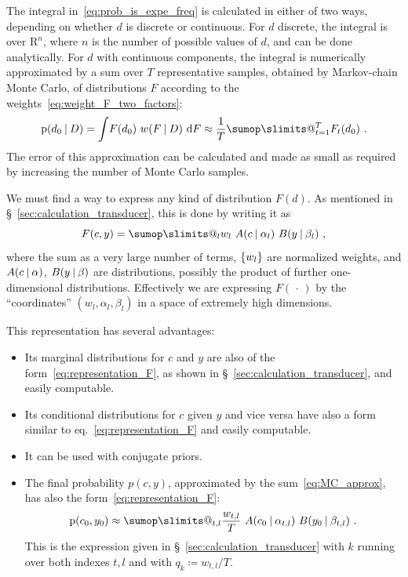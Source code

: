 \documentclass[\ifafour a4paper,12pt,\else a5paper,10pt,\fi%
onecolumn,oneside,article,%
british%
]{memoir}
\makeatletter
\theoremstyle{remark}
\theoremstyle{innote}
\def\sum{\DOTSI\sumop\slimits@}
\newcommand*{\di}{\mathrm{d}}%
\newcommand*{\RR}{\bm{\mathrm{R}}}
\newcommand*{\defd}{\coloneqq}
\newcommand*{\dotv}{\mathord{\,\cdot\,}}%
\DeclarePairedDelimiter\set{\{}{\}} %
\newcommand*{\p}{\mathrm{p}}%
\renewcommand*{\|}[1][]{\nonscript\:#1\vert\nonscript\:\mathopen{}}
\newcommand*{\sect}{\S}%
\newcommand*{\eqn}{eq.}%
\newcommand*{\wf}{w}
\makeatother
\begin{document}
The integral in~\eqref{eq:prob_is_expe_freq} is calculated in either of two ways, depending on whether $d$ is discrete or continuous. For $d$ discrete, the integral is over $\RR^{n}$, where $n$ is the number of possible values of $d$, and can be done analytically. For $d$ with continuous components, the integral is numerically approximated by a sum over $T$ representative samples, obtained by Markov-chain Monte Carlo, of distributions $F$ according to the weights~\eqref{eq:weight_F_two_factors}:
\begin{equation}
  \label{eq:MC_approx}
  \p(d_{0} \| D) = \int\! F(d_{0})\ \wf(F \| D)\ \di F
  \approx
\frac{1}{T}\sum_{t=1}^{T} F_{t}(d_{0}) \ .  
\end{equation}
The error of this approximation can be calculated and made as small as required by increasing the number of Monte Carlo samples.

We must find a way to express any kind of distribution $F(d)$. As mentioned in \sect~\ref{sec:calculation_transducer}, this is done by writing it as
\begin{equation}
  \label{eq:representation_F}
  F(c, y) = \sum_{l} w_{l}\ A(c \| \alpha_{l})\ B(y \| \beta_{l}) \ ,
\end{equation}
where the sum as a very large number of terms, $\set{w_{l}}$ are normalized weights, and $A(c\|\alpha)$, $B(y \| \beta)$ are distributions, possibly the product of further one-dimensional distributions. Effectively we are expressing $F(\dotv)$ by the \enquote{coordinates} $(w_{l}, \alpha_{l}, \beta_{l})$ in a space of extremely high dimensions.

This representation \autocites[promoted by]{dunsonetal2011}[see also][]{rasmussen1999} has several advantages:
\begin{itemize}
\item Its marginal distributions for $c$ and $y$ are also of the form~\eqref{eq:representation_F}, as shown in \sect~\ref{sec:calculation_transducer}, and easily computable.
\item Its conditional distributions for $c$ given $y$ and vice versa have also a form similar to \eqn~\eqref{eq:representation_F} and easily computable.
\item It can be used with conjugate priors.
\item The final probability $p(c,y)$, approximated by the sum~\eqref{eq:MC_approx}, has also the form~\eqref{eq:representation_F}:
  \begin{equation}
    \label{eq:sum_of_sums_for_prob}
    \p(c_{0}, y_{0}) \approx
    \sum_{t,l} \frac{w_{t,l}}{T}
    \ A(c_{0} \| \alpha_{t,l})\ B(y_{0} \| \beta_{t,l}) \ .
  \end{equation}
This is the expression given in \sect~\ref{sec:calculation_transducer} with $k$ running over both indexes $t,l$ and with $q_{k} \defd w_{t,l}/T$.
\end{itemize}
\end{document}
